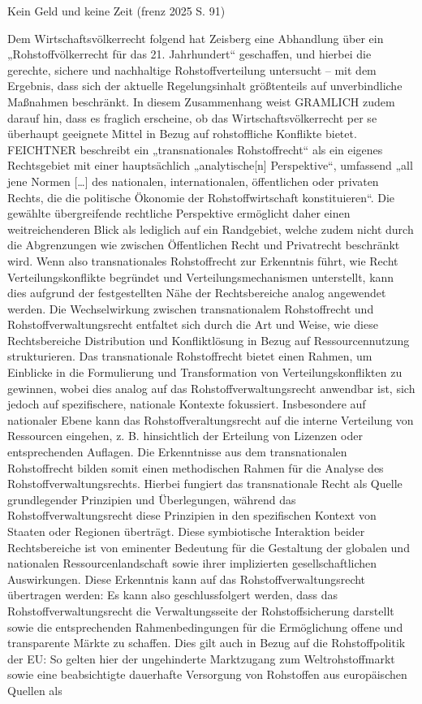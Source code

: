 \documentclass[12pt,a4paper,oneside]{book} %
\begin{document}
Kein Geld und keine Zeit (frenz 2025 S. 91)

Dem Wirtschaftsvölkerrecht folgend hat Zeisberg eine Abhandlung über ein „Rohstoffvölkerrecht für das 21. Jahrhundert“ geschaffen,\autocite{zeisberg_rohstoffvolkerrecht_2021} und hierbei die gerechte, sichere und nachhaltige Rohstoffverteilung untersucht – mit dem Ergebnis, dass sich der aktuelle Regelungsinhalt größtenteils auf unverbindliche Maßnahmen beschränkt. In diesem Zusammenhang weist GRAMLICH zudem darauf hin, dass es fraglich erscheine, ob das Wirtschaftsvölkerrecht per se überhaupt geeignete Mittel in Bezug auf rohstoffliche Konflikte bietet.\autocite{gramlich_zeisberg_2021} FEICHTNER beschreibt ein „transnationales Rohstoffrecht“ als ein eigenes Rechtsgebiet mit einer hauptsächlich „analytische[n] Perspektive“, umfassend „all jene Normen […] des nationalen, internationalen, öffentlichen oder privaten Rechts, die die politische Ökonomie der Rohstoffwirtschaft konstituieren“.\autocite{feichtner_besonderheit_2016} Die gewählte übergreifende rechtliche Perspektive ermöglicht daher einen weitreichenderen Blick als lediglich auf ein Randgebiet, welche zudem nicht durch die Abgrenzungen wie zwischen Öffentlichen Recht und Privatrecht beschränkt wird. Wenn also transnationales Rohstoffrecht zur Erkenntnis führt, wie Recht Verteilungskonflikte begründet und Verteilungsmechanismen unterstellt,\autocite{feichtner_besonderheit_2016} kann dies aufgrund der festgestellten Nähe der Rechtsbereiche analog angewendet werden. Die Wechselwirkung zwischen transnationalem Rohstoffrecht und Rohstoffverwaltungsrecht entfaltet sich durch die Art und Weise, wie diese Rechtsbereiche Distribution und Konfliktlösung in Bezug auf Ressourcennutzung strukturieren. Das transnationale Rohstoffrecht bietet einen Rahmen, um Einblicke in die Formulierung und Transformation von Verteilungskonflikten zu gewinnen, wobei dies analog auf das Rohstoffverwaltungsrecht anwendbar ist, sich jedoch auf spezifischere, nationale Kontexte fokussiert. Insbesondere auf nationaler Ebene kann das Rohstoffveraltungsrecht auf die interne Verteilung von Ressourcen eingehen, z. B. hinsichtlich der Erteilung von Lizenzen oder entsprechenden Auflagen. Die Erkenntnisse aus dem transnationalen Rohstoffrecht bilden somit einen methodischen Rahmen für die Analyse des Rohstoffverwaltungsrechts. Hierbei fungiert das transnationale Recht als Quelle grundlegender Prinzipien und Überlegungen, während das Rohstoffverwaltungsrecht diese Prinzipien in den spezifischen Kontext von Staaten oder Regionen überträgt. Diese symbiotische Interaktion beider Rechtsbereiche ist von eminenter Bedeutung für die Gestaltung der globalen und nationalen Ressourcenlandschaft sowie ihrer implizierten gesellschaftlichen Auswirkungen. Diese Erkenntnis kann auf das Rohstoffverwaltungsrecht übertragen werden: Es kann also geschlussfolgert werden, dass das Rohstoffverwaltungsrecht die Verwaltungsseite der Rohstoffsicherung darstellt sowie die entsprechenden Rahmenbedingungen für die Ermöglichung offene und transparente Märkte zu schaffen. Dies gilt auch in Bezug auf die Rohstoffpolitik der EU: So gelten hier der ungehinderte Marktzugang zum Weltrohstoffmarkt sowie eine beabsichtigte dauerhafte Versorgung von Rohstoffen aus europäischen Quellen als 
\end{document}
